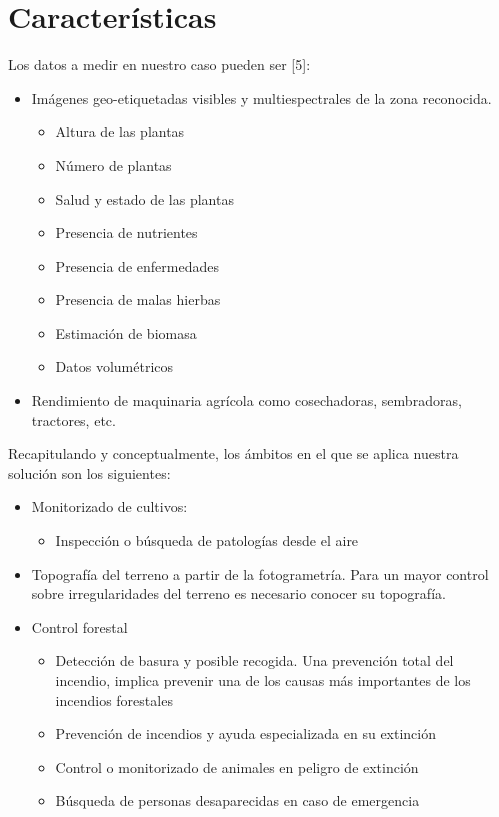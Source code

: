 \documentclass[11pt,spanish]{article} %
\begin{document}
\section{Características}
Los datos a medir en nuestro caso pueden ser [5]:

\begin{itemize}
	\item Imágenes geo-etiquetadas visibles y multiespectrales de la zona reconocida.
	\begin{itemize}
		\item Altura de las plantas
		\item Número de plantas
		\item Salud y estado de las plantas
		\item Presencia de nutrientes
		\item Presencia de enfermedades
		\item Presencia de malas hierbas
		\item Estimación de biomasa
		\item Datos volumétricos
	\end{itemize}

	\item Rendimiento de maquinaria agrícola como cosechadoras, sembradoras, tractores, etc.
\end{itemize}


Recapitulando y conceptualmente, los ámbitos en el que se aplica nuestra solución son los siguientes:	
\begin{itemize}
	\item Monitorizado de cultivos:
	\begin{itemize}
		\item Inspección o búsqueda de patologías desde el aire
	\end{itemize}
	\item Topografía del terreno a partir de la fotogrametría.
	Para un mayor control sobre irregularidades del terreno es necesario conocer su topografía.
	\item Control forestal
	\begin{itemize}
		\item Detección de basura y posible recogida.
		Una prevención total del incendio, implica prevenir una de los causas más importantes de los incendios forestales
		\item Prevención de incendios y ayuda especializada en su extinción
		\item Control o monitorizado de animales en peligro de extinción
		\item Búsqueda de personas desaparecidas en caso de emergencia
	\end{itemize}
	
\end{itemize}
\end{document}
